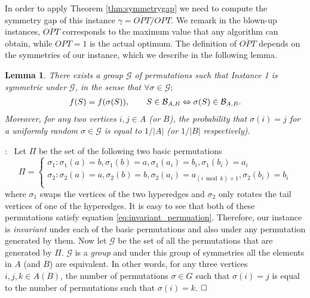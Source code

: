 \documentclass{article}[11pt]
\newtheorem{lemma}[theorem]{Lemma}
\renewenvironment{proof}{\noindent{\bf Proof}:~}{$\hfill \Box$\\}
\def\cB{{\cal B}}
\def\cG{{\mathcal{G}}}
\begin{document}
In order to apply Theorem \ref{thm:symmetrygap} we need to compute the symmetry gap
of this instance $\gamma=\overline{OPT}/OPT$.
We remark in the blown-up instances, $\overline{OPT}$ corresponds to the maximum value
that any algorithm can obtain, while $OPT=1$ is the actual optimum.
The definition of $\overline{OPT}$ depends on the symmetries of our instance,
which we describe in the following lemma.



\begin{lemma}
\label{lem:symmetricgroups}
There exists a group $\cG$ of permutations such that Instance 1
is symmetric under $\cG$, in the sense that $\forall \sigma \in \cG;$
\begin{eqnarray}
\label{eq:invariant_permuation}
f(S) = f(\sigma(S)), ~~~~~~
S\in \cB_{A,B} \Leftrightarrow \sigma(S)\in \cB_{A,B}.  
\end{eqnarray}
Moreover, for any two vertices $i,j \in A$ (or $B$), the probability that
$\sigma(i) = j$ for a uniformly random $\sigma \in \cG$ is equal to $1/|A|$
(or $1/|B|$ respectively).
\end{lemma}

\begin{proof}
Let $\Pi$ be the set of the following two basic permutations
$$
\Pi=
\begin{cases} 
\sigma_1: \sigma_1(a)=b, \sigma_1(b)=a, \sigma_1(a_i)=b_i, \sigma_1(b_i)=a_i \\
\sigma_2: \sigma_2(a)=a, \sigma_2(b)=b, \sigma_2(a_i)=a_{(i \bmod k)+1}, \sigma_2(b_i)=b_i \\
\end{cases}
$$
where $\sigma_1$ swaps the vertices of the two hyperedges and $\sigma_2$
only rotates the tail vertices of  one of the hyperedges.
It is easy to see that both of these permutations satisfy equation
 \eqref{eq:invariant_permuation}. Therefore, our instance is {\em{invariant}}
under each of the basic permutations and also under any permutation generated by them.
Now let $\mathcal{G}$ be the set of all the permutations that are generated by $\Pi$.
$\mathcal{G}$ is a {\em group} and under this group of symmetries all the elements
in $A$ (and $B$) are equivalent. In other words, for any three vertices $i,j,k\in A(B)$,
the number of permutations $\sigma \in G$ such that $\sigma(i) = j$ is equal to the
number of permutations such that $\sigma(i) = k$.
\end{proof}
\end{document}
